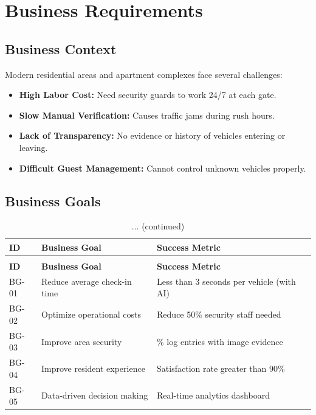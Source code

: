 \documentclass[a4paper]{article}
\begin{document}
\newpage
\section{Business Requirements}

\subsection{Business Context}
Modern residential areas and apartment complexes face several challenges:
\begin{itemize}
    \item \textbf{High Labor Cost:} Need security guards to work 24/7 at each gate.
    \item \textbf{Slow Manual Verification:} Causes traffic jams during rush hours.
    \item \textbf{Lack of Transparency:} No evidence or history of vehicles entering or leaving.
    \item \textbf{Difficult Guest Management:} Cannot control unknown vehicles properly.
\end{itemize}

\subsection{Business Goals}
\begin{longtable}{@{}
    >{\raggedright\arraybackslash}p{}
    p{}
    >{\raggedright\arraybackslash}p{} @{}}

    \caption{Business Goals}
    \label{tab:business_goals} \\

    \toprule
    \textbf{ID} & \textbf{Business Goal} & \textbf{Success Metric} \\
    \midrule
    \endfirsthead

    \caption[]{... (continued)} \\
    \toprule
    \textbf{ID} & \textbf{Business Goal} & \textbf{Success Metric} \\
    \midrule
    \endhead

    \bottomrule
    \endlastfoot

    BG-01 & Reduce average check-in time & Less than 3 seconds per vehicle (with AI) \\
    \addlinespace
    BG-02 & Optimize operational costs & Reduce 50\% security staff needed \\
    \addlinespace
    BG-03 & Improve area security & 100\% log entries with image evidence \\
    \addlinespace
    BG-04 & Improve resident experience & Satisfaction rate greater than 90\% \\
    \addlinespace
    BG-05 & Data-driven decision making & Real-time analytics dashboard \\
\end{longtable}
\end{document}
